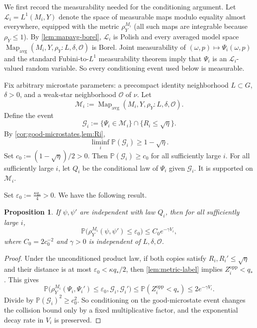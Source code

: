 \documentclass[12pt]{amsart}
\newtheorem{proposition}[proposition]{Proposition}
\theoremstyle{definition}
\newcommand{\Mapavg}{\operatorname{Map}_{\mathrm{avg}}}
\newcommand{\cO}{\mathcal O}
\newcommand{\1}{\mathbf 1}
\newcommand{\eps}{\varepsilon}
\begin{document}
We first record the measurability needed for the conditioning argument. Let $\mathscr L_i=L^1(M_i,Y)$ denote the space of measurable maps modulo equality almost everywhere, equipped with the metric $\rho_Y^{M_i}$ (all such maps are integrable because $\rho_Y\leq1$). By \cref{lem:mapavg-borel}, $\mathscr L_i$ is Polish and every averaged model space $\Mapavg(M_i,Y,\rho_Y:L,\delta,\cO)$ is Borel. Joint measurability of $(\omega,p)\mapsto\Psi_i(\omega,p)$ and the standard Fubini-to-$L^1$ measurability theorem imply that $\Psi_i$ is an $\mathscr L_i$-valued random variable. So every conditioning event used below is measurable.

Fix arbitrary microstate parameters: a precompact identity neighborhood $L\subset G$, $\delta>0$, and a weak-star neighborhood $\cO$ of $\nu$. Let
\[
 \mathscr M_i:=\Mapavg(M_i,Y,\rho_Y:L,\delta,\cO).
\]
Define the event
\[
 \mathcal G_i:=\{\Psi_i\in\mathscr M_i\}\cap\{R_i\leq\sqrt\eta\}.
\]
By \cref{cor:good-microstates,lem:Ri},
\begin{equation}\label{eq:good-probability}
 \liminf_i\mathbb P(\mathcal G_i)\geq1-\sqrt\eta.
\end{equation}
Set $c_0:=(1-\sqrt\eta)/2>0$. Then $\mathbb P(\mathcal G_i)\geq c_0$ for all sufficiently large $i$.
For all sufficiently large $i$, let $Q_i$ be the conditional law of $\Psi_i$ given $\mathcal G_i$. It is supported on $\mathscr M_i$.

Set
$
 \eps_0:=\frac{\kappa q_*}{4}>0.
$ We have the following result.

\begin{proposition}\label{prop:collision}
If $\psi,\psi'$ are independent with law $Q_i$, then for all sufficiently large $i$,
\begin{equation}\label{eq:collision}
 \mathbb P\bigl(\rho_Y^{M_i}(\psi,\psi')\leq\eps_0\bigr)
 \leq C_0e^{-\gamma V_i},
\end{equation}
where $C_0=2c_0^{-2}$ and $\gamma>0$ is independent of $L,\delta,\cO$.
\end{proposition}

\begin{proof}
Under the unconditioned product law, if both copies satisfy $R_i,R_i'\leq\sqrt\eta$ and their distance is at most $\eps_0<\kappa q_*/2$, then \cref{lem:metric-label} implies $Z_i^\mathrm{opp}<q_*$. This gives
\[
 \mathbb P\bigl(
 \rho_Y^{M_i}(\Psi_i,\Psi_i')\leq\eps_0,
 \mathcal G_i,\mathcal G_i'
 \bigr)
 \leq\mathbb P(Z_i^\mathrm{opp}<q_*)
 \leq2e^{-\gamma V_i}.
\]
Divide by $\mathbb P(\mathcal G_i)^2\geq c_0^2$. So conditioning on the
good-microstate event changes the collision bound only by a fixed
multiplicative factor, and the exponential decay rate in $V_i$ is preserved.
\end{proof}
\end{document}
